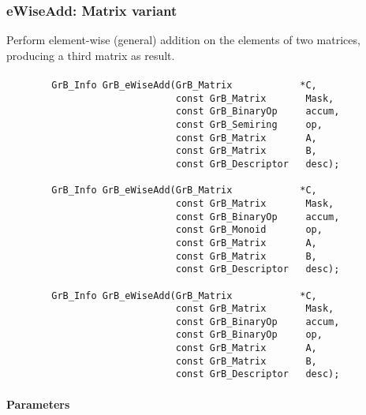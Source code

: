 
\subsubsection{{\sf eWiseAdd}: Matrix variant}

Perform element-wise (general) addition on the elements of two matrices,
producing a third matrix as result.

\paragraph{\syntax}

\begin{verbatim}
        GrB_Info GrB_eWiseAdd(GrB_Matrix            *C,
                              const GrB_Matrix       Mask,
                              const GrB_BinaryOp     accum,
                              const GrB_Semiring     op, 
                              const GrB_Matrix       A,
                              const GrB_Matrix       B,
                              const GrB_Descriptor   desc);
                            
        GrB_Info GrB_eWiseAdd(GrB_Matrix            *C,
                              const GrB_Matrix       Mask,
                              const GrB_BinaryOp     accum,
                              const GrB_Monoid       op, 
                              const GrB_Matrix       A,
                              const GrB_Matrix       B,
                              const GrB_Descriptor   desc);
                            
        GrB_Info GrB_eWiseAdd(GrB_Matrix            *C,
                              const GrB_Matrix       Mask,
                              const GrB_BinaryOp     accum,
                              const GrB_BinaryOp     op, 
                              const GrB_Matrix       A,
                              const GrB_Matrix       B,
                              const GrB_Descriptor   desc);
\end{verbatim}

\paragraph{Parameters}


